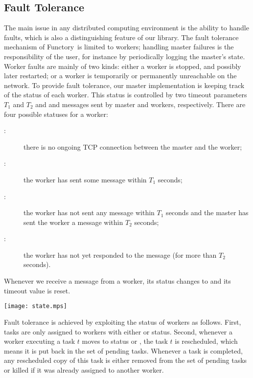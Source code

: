 \documentclass[tfpsymp,pagenumbers]{tfp07symp}
\newcommand{\functory}{\textsf{Functory}}
\begin{document}
\subsection{Fault Tolerance}\label{sec:fault}

The main issue in any distributed computing environment is the ability
to handle faults, which is also a distinguishing feature of our
library.  
The fault tolerance mechanism of \functory\ is limited to workers;
handling master failures is the responsibility of the user, for
instance by periodically logging the master's state.
Worker faults are mainly of two kinds: either a worker is stopped,
and possibly later restarted; or a worker is temporarily or
permanently unreachable on the network. To provide fault tolerance,
our master implementation is keeping track of the status of each
worker.  This status is controlled by two timeout parameters $T_1$ and
$T_2$ and  and  messages sent by master and workers,
respectively. There are four possible statuses for a worker:
\begin{description}
\item[:] there is no ongoing TCP connection between
  the master and the worker;
\item[:] the worker has sent some message
  within $T_1$ seconds;
\item[:] the worker has not sent any message within $T_1$
  seconds and the master has sent the worker a
   message within $T_2$ seconds;
\item[:] the worker has not yet responded to the 
  message (for more than $T_2$ seconds).
\end{description}
Whenever we receive a message from a worker, its status changes to
 and its timeout value is reset.
\begin{center}
  \texttt{[image: state.mps]}
\end{center}

Fault tolerance is achieved by exploiting the status of workers as
follows. First, tasks are only assigned to workers with either
 or  status. Second, whenever a worker executing
a task $t$ moves to status  or , the
task $t$ is rescheduled, which means it is put back in the set of
pending tasks. Whenever a task is completed, any rescheduled copy of
this task is either removed from the set of pending tasks or killed if
it was already assigned to another worker.
\end{document}
